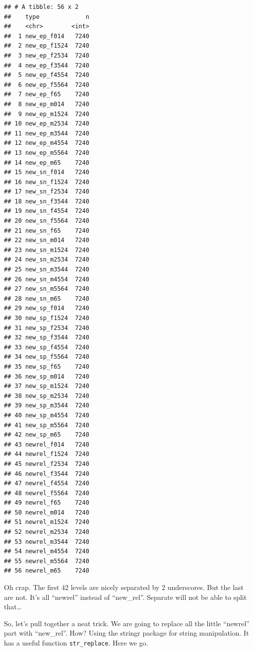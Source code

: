 \documentclass[]{tufte-book}
\newenvironment{Shaded}{}{}
\newcommand{\DataTypeTok}[1]{\textcolor[rgb]{0.56,0.13,0.00}{#1}}
\newcommand{\KeywordTok}[1]{\textcolor[rgb]{0.00,0.44,0.13}{\textbf{#1}}}
\newcommand{\NormalTok}[1]{#1}
\newcommand{\OperatorTok}[1]{\textcolor[rgb]{0.40,0.40,0.40}{#1}}
\newcommand{\OtherTok}[1]{\textcolor[rgb]{0.00,0.44,0.13}{#1}}
\newcommand{\StringTok}[1]{\textcolor[rgb]{0.25,0.44,0.63}{#1}}
\begin{document}
\begin{verbatim}
## # A tibble: 56 x 2
##    type             n
##    <chr>        <int>
##  1 new_ep_f014   7240
##  2 new_ep_f1524  7240
##  3 new_ep_f2534  7240
##  4 new_ep_f3544  7240
##  5 new_ep_f4554  7240
##  6 new_ep_f5564  7240
##  7 new_ep_f65    7240
##  8 new_ep_m014   7240
##  9 new_ep_m1524  7240
## 10 new_ep_m2534  7240
## 11 new_ep_m3544  7240
## 12 new_ep_m4554  7240
## 13 new_ep_m5564  7240
## 14 new_ep_m65    7240
## 15 new_sn_f014   7240
## 16 new_sn_f1524  7240
## 17 new_sn_f2534  7240
## 18 new_sn_f3544  7240
## 19 new_sn_f4554  7240
## 20 new_sn_f5564  7240
## 21 new_sn_f65    7240
## 22 new_sn_m014   7240
## 23 new_sn_m1524  7240
## 24 new_sn_m2534  7240
## 25 new_sn_m3544  7240
## 26 new_sn_m4554  7240
## 27 new_sn_m5564  7240
## 28 new_sn_m65    7240
## 29 new_sp_f014   7240
## 30 new_sp_f1524  7240
## 31 new_sp_f2534  7240
## 32 new_sp_f3544  7240
## 33 new_sp_f4554  7240
## 34 new_sp_f5564  7240
## 35 new_sp_f65    7240
## 36 new_sp_m014   7240
## 37 new_sp_m1524  7240
## 38 new_sp_m2534  7240
## 39 new_sp_m3544  7240
## 40 new_sp_m4554  7240
## 41 new_sp_m5564  7240
## 42 new_sp_m65    7240
## 43 newrel_f014   7240
## 44 newrel_f1524  7240
## 45 newrel_f2534  7240
## 46 newrel_f3544  7240
## 47 newrel_f4554  7240
## 48 newrel_f5564  7240
## 49 newrel_f65    7240
## 50 newrel_m014   7240
## 51 newrel_m1524  7240
## 52 newrel_m2534  7240
## 53 newrel_m3544  7240
## 54 newrel_m4554  7240
## 55 newrel_m5564  7240
## 56 newrel_m65    7240
\end{verbatim}

Oh crap. The first 42 levels are nicely separated by 2 underscores. But the last are not. It's all ``newrel'' instead of ``new\_rel''. Separate will not be able to split that\ldots{}

So, let's pull together a neat trick. We are going to replace all the little ``newrel'' part with ``new\_rel''. How? Using the stringr package for string manipulation. It has a useful function \texttt{str\_replace}. Here we go.

\begin{Shaded}
\end{Shaded}
\end{document}
